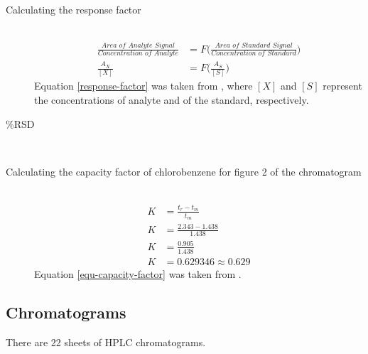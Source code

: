 \documentclass[a4paper, 12pt]{article}
\begin{document}
\begin{description}
	\item[Calculating the response factor] \hfill \\
		\begin{equation} \label{response-factor}
		\begin{split}
			\frac{\textit{Area of Analyte Signal}}{\textit{Concentration of Analyte}} & = F\Bigg(\frac{\textit{Area of Standard Signal}}{\textit{Concentration of Standard}}\Bigg) \\
			\frac{A_X}{[X]} & = F\Bigg(\frac{A_S}{[S]}\Bigg)
		\end{split}
		\end{equation}
			Equation \ref{response-factor} was taken from \cite{harris}, where $[X]$ and $[S]$ represent the concentrations of analyte and of the standard, respectively.

	\item[$\%$RSD] \hfill \\

	\item[Calculating the capacity factor of chlorobenzene for figure 2 of the chromatogram] \hfill \\
		\begin{equation} \label{equ-capacity-factor}
			\begin{split}
				K & = \frac{t_r - t_m}{t_m} \\
				K & = \frac{2.343 - 1.438}{1.438} \\
				K & = \frac{0.905}{1.438} \\
				K & = 0.629346 \approx 0.629
			\end{split}
		\end{equation}
		Equation \ref{equ-capacity-factor} was taken from \cite{harris}.
\end{description}

\subsection{Chromatograms}
There are 22 sheets of HPLC chromatograms.

\end{document}
